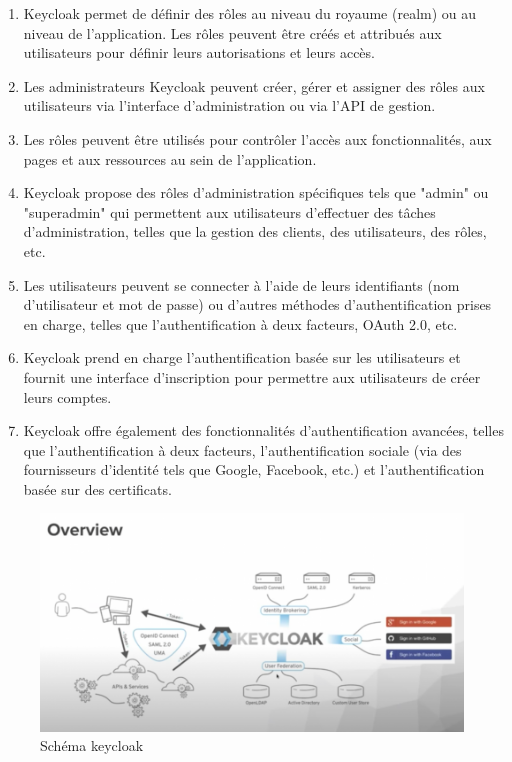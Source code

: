 \begin{enumerate}
	\item Keycloak permet de définir des rôles au niveau du royaume (realm) ou au niveau de l'application. Les rôles peuvent être créés et attribués aux utilisateurs pour définir leurs autorisations et leurs accès.
	\item Les administrateurs Keycloak peuvent créer, gérer et assigner des rôles aux utilisateurs via l'interface d'administration ou via l'API de gestion.
	\item Les rôles peuvent être utilisés pour contrôler l'accès aux fonctionnalités, aux pages et aux ressources au sein de l'application.
	\item Keycloak propose des rôles d'administration spécifiques tels que "admin" ou "superadmin" qui permettent aux utilisateurs d'effectuer des tâches d'administration, telles que la gestion des clients, des utilisateurs, des rôles, etc.
	\item Les utilisateurs peuvent se connecter à l'aide de leurs identifiants (nom d'utilisateur et mot de passe) ou d'autres méthodes d'authentification prises en charge, telles que l'authentification à deux facteurs, OAuth 2.0, etc.
	\item Keycloak prend en charge l'authentification basée sur les utilisateurs et fournit une interface d'inscription pour permettre aux utilisateurs de créer leurs comptes.
	\item Keycloak offre également des fonctionnalités d'authentification avancées, telles que l'authentification à deux facteurs, l'authentification sociale (via des fournisseurs d'identité tels que Google, Facebook, etc.) et l'authentification basée sur des certificats.
\end{enumerate}

\begin{figure}[H]
\centering
\includegraphics[width=\linewidth]{images/Keycloak-overview-screenshot.png}
\caption{Schéma keycloak}\label{fig:keycloak}
\end{figure}


